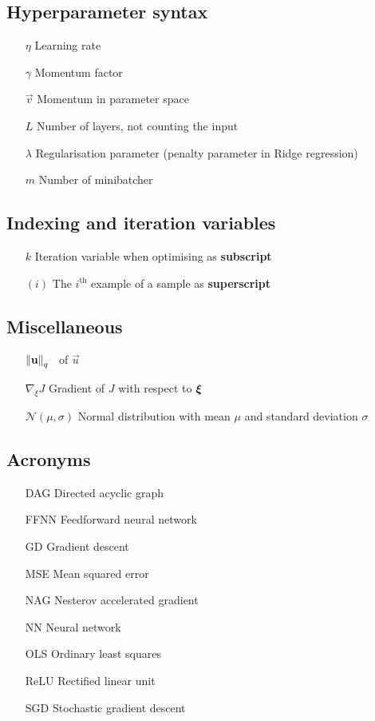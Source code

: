 \subsection{Hyperparameter syntax}
\begin{itemize}
    \item[$\eta$] Learning rate
    \item[$\gamma$] Momentum factor
    \item[$\vec{v}$] Momentum in parameter space  
    \item[$L$] Number of layers, not counting the input 
    \item[$\lambda$] Regularisation parameter (penalty parameter in Ridge regression)
    \item[$m$] Number of minibatcher
\end{itemize}


\subsection{Indexing and iteration variables}
\begin{itemize}
    \item[$k$] Iteration variable when optimising as \textbf{subscript}
    \item[$(i)$] The $i^\mathrm{th}$ example of a sample as \textbf{superscript}
\end{itemize}


\subsection{Miscellaneous}

\begin{enumerate}[leftmargin=2.1em]
    \item[$\norm{\mathbf{u}}_q$] \lnorm[q]\, of $\vec{u}$
    \item[$\nabla_{\!\xi} J$] Gradient of $J$ with respect to $\boldsymbol{\xi}$
    \item[$\mathcal{N}(\mu, \sigma)$]  Normal distribution with mean $\mu$ and standard deviation $\sigma$
\end{enumerate}

\subsection{Acronyms}
\begin{enumerate}[leftmargin=2.6em]
    \item[DAG] Directed acyclic graph
    \item[FFNN] Feedforward neural network
    \item[GD] Gradient descent
    \item[MSE] Mean squared error 
    \item[NAG] Nesterov accelerated gradient
    \item[NN] Neural network 
    \item[OLS] Ordinary least squares 
    \item[ReLU] Rectified linear unit
    \item[SGD] Stochastic gradient descent 
\end{enumerate}


